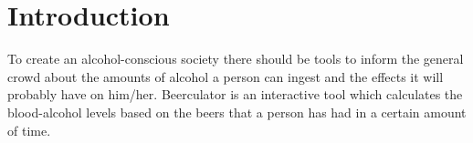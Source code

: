 \section{Introduction}
\label{sec:intro}

To create an alcohol-conscious society there should be tools to inform the general crowd about the amounts of alcohol a person can ingest and the effects it will probably have on him/her. Beerculator is an interactive tool which calculates the blood-alcohol levels based on the beers that a person has had in a certain amount of time.
